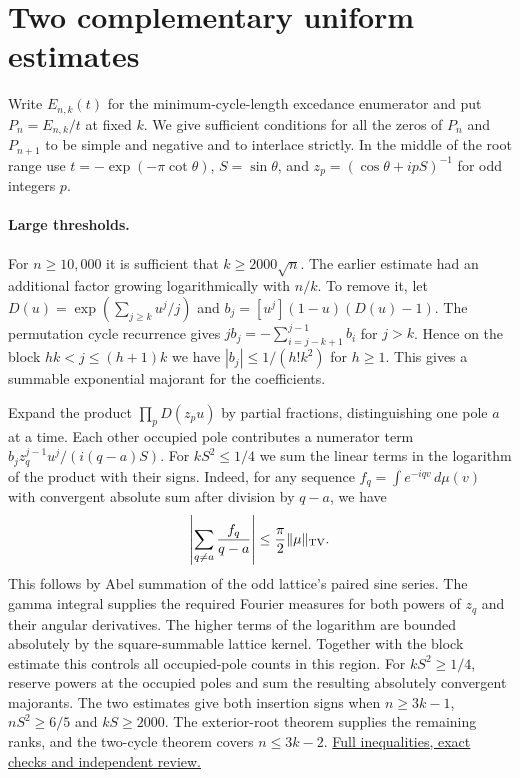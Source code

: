 \section{Two complementary uniform estimates}
Write $E_{n,k}(t)$ for the minimum-cycle-length excedance enumerator and put
$P_n=E_{n,k}/t$ at fixed $k$.  We give sufficient conditions for all the
zeros of $P_n$ and $P_{n+1}$ to be simple and negative and to interlace strictly.
In the middle of the root range use
$t=-\exp(-\pi\cot\theta)$, $S=\sin\theta$, and
$z_p=(\cos\theta+ipS)^{-1}$ for odd integers $p$.

\paragraph{Large thresholds.}
For $n\ge10{,}000$ it is sufficient that $k\ge2000\sqrt n$.
The earlier estimate had an additional factor growing logarithmically with
$n/k$. To remove it, let
$D(u)=\exp(\sum_{j\ge k}u^j/j)$ and
$b_j=[u^j](1-u)(D(u)-1)$.  The permutation cycle recurrence gives
$j b_j=-\sum_{i=j-k+1}^{j-1}b_i$ for $j>k$.
Hence on the block $hk<j\le(h+1)k$ we have
$|b_j|\le1/(h!k^2)$ for $h\ge1$.
This gives a summable exponential majorant for the coefficients.

Expand the product $\prod_p D(z_pu)$ by partial fractions, distinguishing
one pole $a$ at a time. Each other occupied pole contributes a numerator
term $b_jz_q^{j-1}u^j/(i(q-a)S)$. For $kS^2\le1/4$ we sum the linear terms in the logarithm
of the product with their signs. Indeed, for any sequence
$f_q=\int e^{-iqv}\,d\mu(v)$ with convergent absolute sum after division by
$q-a$, we have
\[
\left|\sum_{q\ne a}\frac{f_q}{q-a}\right|\le
\frac{\pi}{2}\|\mu\|_{\rm TV}.
\]
This follows by Abel summation of the odd lattice's paired sine series.
The gamma integral supplies the required Fourier measures for both powers
of $z_q$ and their angular derivatives. The higher terms of the logarithm
are bounded absolutely by the square-summable lattice kernel. Together with
the block estimate this controls all occupied-pole counts in this region.
For $kS^2\ge1/4$, reserve powers at the occupied poles and sum the resulting
absolutely convergent majorants. The two estimates give both insertion
signs when $n\ge3k-1$, $nS^2\ge6/5$ and $kS\ge2000$. The exterior-root
theorem supplies the remaining ranks, and the two-cycle theorem covers
$n\le3k-2$.
\href{https://github.com/ProgramComputer/open-math-research/tree/main/topics/long-cycle-excedances/uniform-hilbert}{Full inequalities, exact checks and independent review.}

